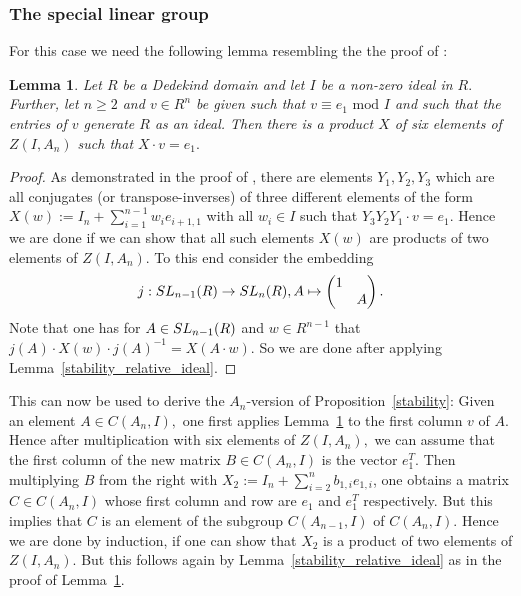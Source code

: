 \documentclass[12pt]{amsart}
\newtheorem{lemma}[theorem]{Lemma}
\theoremstyle{definition}\newtheorem{definition}[theorem]{Definition}
\theoremstyle{remark}\newtheorem{remark}[theorem]{Remark}
\theoremstyle{definition}\newtheorem{case}{Case}
\begin{document}
\subsubsection{The special linear group}

For this case we need the following lemma resembling the the proof of \cite[Theorem~4.2]{MR0174604}:

\begin{lemma}\label{stability_sln_prep_step1}
Let $R$ be a Dedekind domain and let $I$ be a non-zero ideal in $R.$ Further, let $n\geq 2$ and $v\in R^n$ be given such that $v\equiv e_1\text{ mod }I$ and such that the entries of $v$ generate $R$ as an ideal. Then there is a product $X$ of six elements of $Z(I,A_n)$ such that $X\cdot v=e_1.$ 
\end{lemma}

\begin{proof}
As demonstrated in the proof of \cite[Theorem~4.2]{MR0174604}, there are elements $Y_1,Y_2,Y_3$ which are all conjugates (or transpose-inverses) of three different elements of the form $X(w):=I_n+\sum_{i=1}^{n-1} w_ie_{i+1,1}$ with all $w_i\in I$ such that $Y_3Y_2Y_1\cdot v=e_1$. Hence we are done if we can show that all such elements $X(w)$ are products of two elements of $Z(I,A_n).$ To this end consider the embedding 
\[
j:{\rm SL}_{n-1}(R)\to{\rm SL}_n(R),A\mapsto
\begin{pmatrix}
1 & \\
 & A
\end{pmatrix}.
\]
Note that one has for $A\in{\rm SL}_{n-1}(R)$ and $w\in R^{n-1}$ that $j(A)\cdot X(w)\cdot j(A)^{-1}=X(A\cdot w).$ So we are done after applying Lemma~\ref{stability_relative_ideal}.  
\end{proof}

This can now be used to derive the $A_n$-version of Proposition~\ref{stability}: Given an element $A\in C(A_n,I),$ one first applies Lemma~\ref{stability_sln_prep_step1} to the first column $v$ of $A.$ Hence after multiplication with six elements of $ Z(I,A_n),$ we can assume that the first column of the new matrix $B\in C(A_n,I)$ is the vector $e_1^T.$ Then multiplying $B$ from the right with $X_2:=I_n+\sum_{i=2}^n b_{1,i}e_{1,i}$, one obtains a matrix $C\in C(A_n,I)$ whose first column and row are $e_1$ and $e_1^T$ respectively. But this implies that $C$ is an element of the subgroup $C(A_{n-1},I)$ of $C(A_n,I)$. Hence we are done by induction, if one can show that $X_2$ is a product of two elements of $Z(I,A_n).$ But this follows again by Lemma~\ref{stability_relative_ideal} as in the proof of Lemma~\ref{stability_sln_prep_step1}.  
\end{document}
